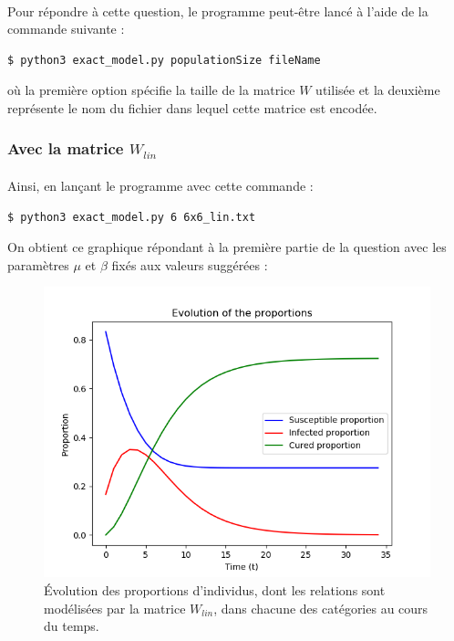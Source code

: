 \documentclass[a4paper, 12pt, oneside]{article}
\begin{document}
\paragraph{}Pour répondre à cette question, le programme peut-être lancé à l'aide de la commande suivante :

\begin{lstlisting}[language=bash]
$ python3 exact_model.py populationSize fileName
\end{lstlisting}

\noindent où la première option spécifie la taille de la matrice $W$ utilisée et la deuxième représente le nom du fichier dans lequel cette matrice est encodée.

\subsubsection{Avec la matrice $W_{lin}$}

\paragraph{}Ainsi, en lançant le programme avec cette commande :

\begin{lstlisting}[language=bash]
$ python3 exact_model.py 6 6x6_lin.txt
\end{lstlisting}

\noindent On obtient ce graphique répondant à la première partie de la question avec les paramètres $\mu$ et $\beta$ fixés aux valeurs suggérées : 

\begin{figure}[H]
	\centering
	\includegraphics[scale=1]{lin_6x6.png} 
	\caption{Évolution des proportions d'individus, dont les relations sont modélisées par la matrice $W_{lin}$, dans chacune des catégories au cours du temps.}
\end{figure}
\end{document}
